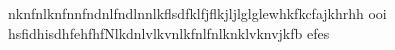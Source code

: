 nknfnlknfnnfndnlfndlnnlkflsdfklfjflkjljlglglewhkfkcfajkhrhh  ooi hsfidhisdhfehfhfNlkdnlvlkvnlkfnlfnlknklvknvjkfb  efes